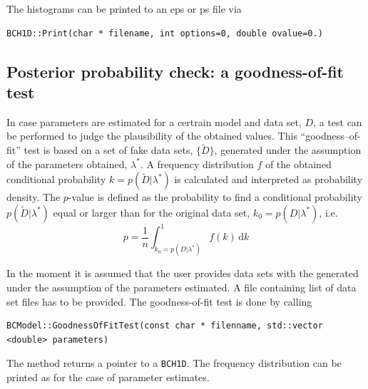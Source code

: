 \documentclass[11pt, a4paper]{article}
\begin{document}
\noindent 
The histograms can be printed to an eps or ps file via 

\begin{small}
\begin{verbatim}
BCH1D::Print(char * filename, int options=0, double ovalue=0.)
\end{verbatim} 
\end{small} 


\subsection{Posterior probability check: a goodness-of-fit test} 

In case parameters are estimated for a certrain model and data set,
$D$, a test can be performed to judge the plausibility of the obtained
values. This ``goodness--of-fit'' test is based on a set of fake data
sets, $\{ \tilde{D} \}$, generated under the assumption of the
parameters obtained, $\lambda^{*}$. A frequency distribution $f$ of
the obtained conditional probability $k=p(\tilde{D}|\lambda^{*})$ is
calculated and interpreted as probability density. The $p$-value is
defined as the probability to find a conditional probability
$p(\tilde{D}|\lambda^{*})$ equal or larger than for the original data
set, $k_{0}=p(D|\lambda^{*})$, i.e.
%
\begin{equation}
p = \frac{1}{n} \int_{k_{0}=p(D|\lambda^{*})}^{1} f(k) \, \mathrm{d}k 
\end{equation} 

\noindent 
In the moment it is assumed that the user provides data sets with the
generated under the assumption of the parameters estimated. A file
containing list of data set files has to be provided. The
goodness-of-fit test is done by calling 
%
\begin{small}
\begin{verbatim}
BCModel::GoodnessOfFitTest(const char * filenname, std::vector <double> parameters) 
\end{verbatim} 
\end{small}

\noindent 
The method returns a pointer to a \verb|BCH1D|. The frequency
distribution can be printed as for the case of parameter estimates. 

\end{document}
